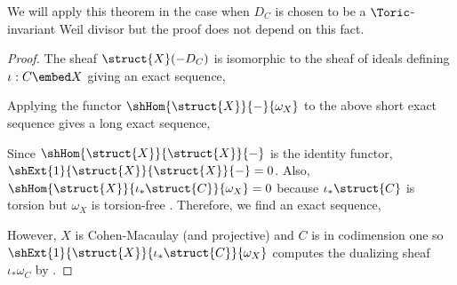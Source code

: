 \begin{rmk}
We will apply this theorem in the case when $D_C$ is chosen to be a $\Toric$-invariant Weil divisor but the proof does not depend on this fact.
\end{rmk}

\begin{proof}
The sheaf $\struct{X}(-D_C)$ is isomorphic to the sheaf of ideals defining $\iota : C \embed X$ giving an exact sequence,
\begin{center}
\end{center}
Applying the functor $\shHom{\struct{X}}{-}{\omega_X}$ to the above short exact sequence gives a long exact sequence,
\begin{center}
\end{center}
Since $\shHom{\struct{X}}{\struct{X}}{-}$ is the identity functor, $\shExt{1}{\struct{X}}{\struct{X}}{-} = 0$. Also, $\shHom{\struct{X}}{\iota_* \struct{C}}{\omega_X} = 0$ because $\iota_* \struct{C}$ is torsion but $\omega_X$ is torsion-free \cite[Ch. 1, Prop. 2.8]{grothendieck_duality}. Therefore, we find an exact sequence,
\begin{center}
\end{center}
However, $X$ is Cohen-Macaulay (and projective) and $C$ is in codimension one so $\shExt{1}{\struct{X}}{\iota_* \struct{C}}{\omega_X}$ computes the dualizing sheaf $\iota_* \omega_C$ by \cite[Ch 1, Prop. 2.3]{grothendieck_duality}.

\end{proof}
